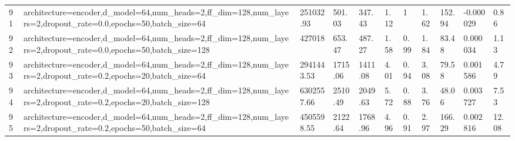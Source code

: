 \begin{longtable}{C{0.8cm} L{2cm} C{1.15cm} C{1.15cm} C{1.15cm} C{1.15cm} C{0.85cm} C{1.25cm} C{1.2cm} C{1.5cm} C{1.0cm}}
91 & architecture=encoder,\newline d\_model=64,\newline num\_heads=2,\newline ff\_dim=128,\newline num\_layers=2,\newline dropout\_rate=0.0,\newline epochs=50,\newline batch\_size=64 & 251032.93 & 501.03 & 347.43 & 1.12 & 1 & 1.62 & 152.94 & -0.000029 & 0.86 \\
92 & architecture=encoder,\newline d\_model=64,\newline num\_heads=2,\newline ff\_dim=128,\newline num\_layers=2,\newline dropout\_rate=0.0,\newline epochs=50,\newline batch\_size=128 & 427018 & 653.47 & 487.27 & 1.58 & 0.99 & 1.84 & 83.48 & 0.000034 & 1.13 \\
93 & architecture=encoder,\newline d\_model=64,\newline num\_heads=2,\newline ff\_dim=128,\newline num\_layers=2,\newline dropout\_rate=0.2,\newline epochs=20,\newline batch\_size=64 & 2941443.53 & 1715.06 & 1411.08 & 4.01 & 0.94 & 3.08 & 79.58 & 0.001586 & 4.79 \\
94 & architecture=encoder,\newline d\_model=64,\newline num\_heads=2,\newline ff\_dim=128,\newline num\_layers=2,\newline dropout\_rate=0.2,\newline epochs=20,\newline batch\_size=128 & 6302557.66 & 2510.49 & 2049.63 & 5.72 & 0.88 & 3.76 & 48.06 & 0.003727 & 7.53 \\
95 & architecture=encoder,\newline d\_model=64,\newline num\_heads=2,\newline ff\_dim=128,\newline num\_layers=2,\newline dropout\_rate=0.2,\newline epochs=50,\newline batch\_size=64 & 4505598.55 & 2122.64 & 1768.96 & 4.96 & 0.91 & 2.97 & 166.29 & 0.002816 & 12.08 \\

\end{longtable}
